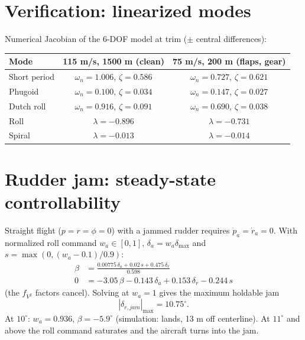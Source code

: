 \documentclass[10pt]{article}
\begin{document}
\section{Verification: linearized modes}
Numerical Jacobian of the 6-DOF model at trim ($\pm$ central differences):

\begin{tabular}{@{}lcc@{}}
\toprule
Mode & 115 m/s, 1500 m (clean) & 75 m/s, 200 m (flaps, gear) \\
\midrule
Short period & $\omega_n=1.006$, $\zeta=0.586$ & $\omega_n=0.727$, $\zeta=0.621$ \\
Phugoid & $\omega_n=0.100$, $\zeta=0.034$ & $\omega_n=0.147$, $\zeta=0.027$ \\
Dutch roll & $\omega_n=0.916$, $\zeta=0.091$ & $\omega_n=0.690$, $\zeta=0.038$ \\
Roll & $\lambda=-0.896$ & $\lambda=-0.731$ \\
Spiral & $\lambda=-0.013$ & $\lambda=-0.014$ \\
\bottomrule
\end{tabular}

\section{Rudder jam: steady-state controllability}
Straight flight ($p=r=\phi=0$) with a jammed rudder requires $\dot p_a=\dot r_a=0$. With normalized roll command
$w_a\in[0,1]$, $\delta_a=w_a\delta_{\max}$ and $s=\max(0,(w_a-0.1)/0.9)$:
\begin{align*}
\beta &= \frac{0.00775\,\delta_a + 0.02\,s + 0.475\,\delta_r}{0.598}\\
0 &= -3.05\,\beta - 0.143\,\delta_a + 0.153\,\delta_r - 0.244\,s
\end{align*}
(the $f_{V^2}$ factors cancel). Solving at $w_a=1$ gives the maximum holdable jam
\[
|\delta_{r,jam}|_{\max}=10.75^\circ.
\]
At $10^\circ$: $w_a=0.936$, $\beta=-5.9^\circ$ (simulation: lands, 13 m off centerline).
At $11^\circ$ and above the roll command saturates and the aircraft turns into the jam.
\end{document}
